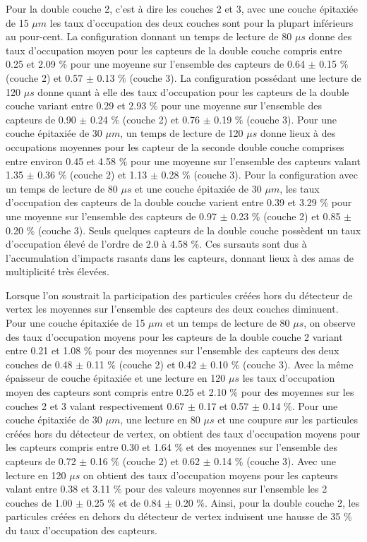   Pour la double couche 2, c'est \`a dire les couches 2 et 3, avec une couche \'epitaxi\'ee de 15 $\mu m$ les taux d'occupation des deux couches sont pour la plupart inf\'erieurs au pour-cent. La configuration donnant un temps de lecture de 80 $\mu s$ donne des taux d'occupation moyen pour les capteurs de la double couche compris entre 0.25 et 2.09 $\%$ pour une moyenne sur l'ensemble des capteurs de 0.64 $\pm$ 0.15 $\%$ (couche 2) et 0.57 $\pm$ 0.13 $\%$ (couche 3). La configuration poss\'edant une lecture de 120 $\mu s$ donne quant \`a elle des taux d'occupation pour les capteurs de la double couche variant entre 0.29 et 2.93 $\%$ pour une moyenne sur l'ensemble des capteurs de 0.90 $\pm$ 0.24 $\%$ (couche 2) et 0.76 $\pm$ 0.19 $\%$ (couche 3). Pour une couche \'epitaxi\'ee de 30 $\mu m$, un temps de lecture de 120 $\mu s$ donne lieux \`a des occupations moyennes pour les capteur de la seconde double couche comprises entre environ 0.45 et 4.58 $\%$ pour une moyenne sur l'ensemble des capteurs valant 1.35 $\pm$ 0.36 $\%$ (couche 2) et 1.13 $\pm$ 0.28 $\%$ (couche 3). Pour la configuration avec un temps de lecture de 80 $\mu s$ et une couche \'epitaxi\'ee de 30 $\mu m$, les taux d'occupation des capteurs de la double couche varient entre 0.39 et 3.29 $\%$ pour une moyenne sur l'ensemble des capteurs de 0.97 $\pm$ 0.23 $\%$ (couche 2) et 0.85 $\pm$ 0.20 $\%$ (couche 3). Seuls quelques capteurs de la double couche poss\`edent un taux d'occupation \'elev\'e de l'ordre de 2.0 \`a 4.58 $\%$. Ces sursauts sont dus \`a l'accumulation d'impacts rasants dans les capteurs, donnant lieux \`a des amas de multiplicit\'e tr\`es \'elev\'ees.
  
  \medskip
  
  Lorsque l'on soustrait la participation des particules cr\'e\'ees hors du d\'etecteur de vertex les moyennes sur l'ensemble des capteurs des deux couches diminuent. Pour une couche \'epitaxi\'ee de 15 $\mu m$ et un temps de lecture de 80 $\mu s$, on observe des taux d'occupation moyens pour les capteurs de la double couche 2 variant entre 0.21 et 1.08 $\%$ pour des moyennes sur l'ensemble des capteurs des deux couches de 0.48 $\pm$ 0.11 $\%$ (couche 2) et 0.42 $\pm$ 0.10 $\%$ (couche 3). Avec la m\^eme \'epaisseur de couche \'epitaxi\'ee et une lecture en 120 $\mu s$ les taux d'occupation moyen des capteurs sont compris entre 0.25 et 2.10 $\%$ pour des moyennes sur les couches 2 et 3 valant respectivement 0.67 $\pm$ 0.17 et 0.57 $\pm$ 0.14 $\%$. Pour une couche \'epitaxi\'ee de 30 $\mu m$, une lecture en 80 $\mu s$ et une coupure sur les particules cr\'e\'ees hors du d\'etecteur de vertex, on obtient des taux d'occupation moyens pour les capteurs compris entre 0.30 et 1.64 $\%$ et des moyennes sur l'ensemble des capteurs de 0.72 $\pm$ 0.16 $\%$ (couche 2) et 0.62 $\pm$ 0.14 $\%$ (couche 3). Avec une lecture en 120 $\mu s$ on obtient des taux d'occupation moyens pour les capteurs valant entre 0.38 et 3.11 $\%$ pour des valeurs moyennes sur l'ensemble les 2 couches de 1.00 $\pm$ 0.25 $\%$ et de 0.84 $\pm$ 0.20 $\%$. Ainsi, pour la double couche 2, les particules cr\'e\'ees en dehors du d\'etecteur de vertex induisent une hausse de 35 $\%$ du taux d'occupation des capteurs.
   
